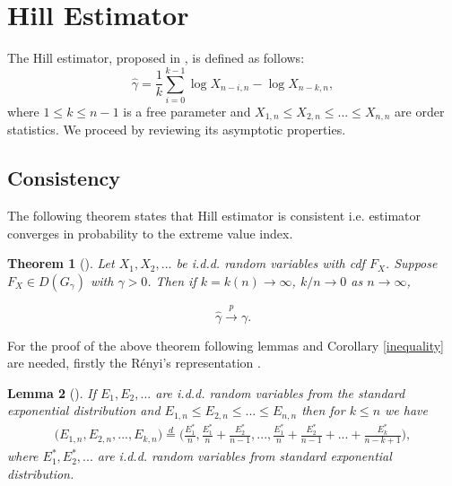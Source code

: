 \documentclass[english,12pt,a4paper,pdftex,sci,utf8]{aaltothesis} %
\newtheorem{theorem}{Theorem}[section]
\newtheorem{lemma}[theorem]{Lemma}
\begin{document}
\clearpage

\section{Hill Estimator}
\label{hillEst}


The Hill estimator, proposed in \cite{hill}, is defined as follows:
\begin{equation*}
\hat{\gamma} = \frac{1}{k} \sum_{i=0}^{k-1} \log X_{n-i,n} - \log X_{n-k,n}, 
\end{equation*}
where $1 \leq k \leq n-1$ is a free parameter and $X_{1,n} \leq X_{2,n} \leq ...  \leq X_{n,n}$ are order statistics. We proceed by reviewing its asymptotic properties.

\subsection{Consistency}

The following theorem states that Hill estimator is consistent i.e. estimator converges in probability to the extreme value index. \cite{mason}


\begin{theorem}[{\cite[Theorem 3.2.2]{deHaan}}]
Let $X_1, X_2,...$ be i.d.d. random variables with cdf $F_X$. Suppose $F_X \in D(G_{\gamma})$ with $\gamma > 0$. Then if $k=k(n)  \rightarrow \infty$, $k/n \rightarrow 0$ as $n \rightarrow \infty$,

\begin{equation*}
\hat{\gamma} \xrightarrow{p} \gamma.
\end{equation*}
\label{hillcons}
\end{theorem}

For the proof of the above theorem following lemmas and Corollary \ref{inequality} are needed, firstly the R{\'e}nyi's representation \cite{renyi}.
\begin{lemma}[{\cite[Equation 1.9]{renyi}}]
If $E_1, E_2,...$ are i.d.d. random variables from the standard exponential distribution and $E_{1,n} \leq E_{2,n} \leq ... \leq E_{n,n}$ then for $k \leq n$ we have
\begin{multline*}
\big(E_{1,n}, E_{2,n}, ... , E_{k,n}\big) 
\overset{d}{=} \Big(\frac{E_1^*}{n}, \frac{E_1^*}{n}+\frac{E_2^*}{n-1}, ... , \frac{E_1^*}{n}+\frac{E_2^*}{n-1}+...+ \frac{E_k^*}{n-k+1}\Big),
\end{multline*}
where $E_1^*,E_2^*,...$ are i.d.d. random variables from standard exponential distribution.
\label{renrep}
\end{lemma}
\end{document}
